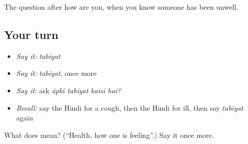\begin{grammarlens}[title={What you've built}]
The question after how are you, when you know someone has been unwell.
\end{grammarlens}

\subsection*{Your turn}
\begin{itemize}
\raggedright
  \item \emph{Say it:} \emph{tabīyat}
  \item \emph{Say it:} \emph{tabīyat}, once more
  \item \emph{Say it:} ask \emph{āpkī tabīyat kaisī hai?}
  \item \emph{Recall:} say the Hindi for a cough, then the Hindi for ill, then say \emph{tabīyat} again
\end{itemize}

\begin{tcolorbox}[breakable,colback=teal!4,colframe=teal!35!black,title={Before you move on}]
What does  mean? (\textquotedblleft{}Health, how one is feeling\textquotedblright{}.) Say it once more.
\end{tcolorbox}
